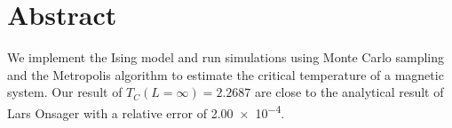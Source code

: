 \section*{Abstract}

We implement the Ising model and run simulations using Monte Carlo sampling
and the Metropolis algorithm to estimate the critical temperature of a magnetic
system.
Our result of $T_C(L=\infty)=2.2687$ are close to the analytical result of Lars
Onsager with a relative error of \num{2.00e-4}.
